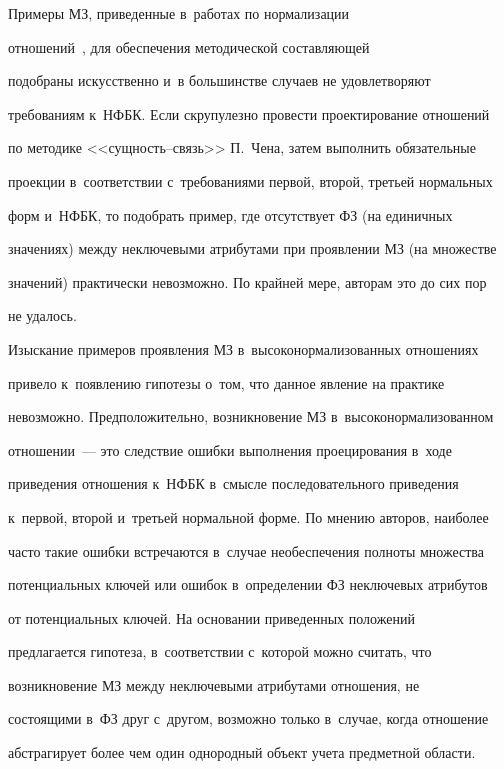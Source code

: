   

  Примеры МЗ, приведенные в~работах по нормализации  

отношений~\cite{9-iv, 13-iv}, для обеспечения методической составляющей 

подобраны искусственно и~в большинстве случаев не удовлетворяют 

требованиям к~НФБК. Если скрупулезно провести проектирование отношений 

по методике <<сущ\-ность--связь>> П.~Чена, затем выполнить обязательные 

проекции в~соответствии с~требованиями первой, второй, третьей нормальных 

форм и~НФБК, то подобрать пример, где отсутствует ФЗ (на единичных 

значениях) между неключевыми атрибутами при проявлении МЗ (на множестве 

значений) практически невозможно. По крайней мере, авторам это до сих пор 

не удалось.

  

  Изыскание примеров проявления МЗ в~высоконормализованных отношениях 

привело к~появлению гипотезы о~том, что данное явление на практике 

невозможно. Предположительно, возникновение МЗ в~высоконормализованном 

отношении~--- это следствие ошибки выполнения проецирования в~ходе 

приведения отношения к~НФБК в~смысле последовательного приведения 

к~первой, второй и~треть\-ей нормальной форме. По мнению авторов, наиболее 

часто такие ошибки встречаются в~случае необеспечения полноты множества 

потенциальных ключей или ошибок в~определении ФЗ неключевых атрибутов 

от потенциальных ключей. На основании приведенных положений 

предлагается гипотеза, в~соответствии с~которой можно считать, что 

возникновение МЗ между неключевыми атрибутами отношения, не 

состоящими в~ФЗ друг с~другом, возможно только в~случае, когда отношение 

абстрагирует более чем один однородный объект учета предметной об\-ласти. 

  


